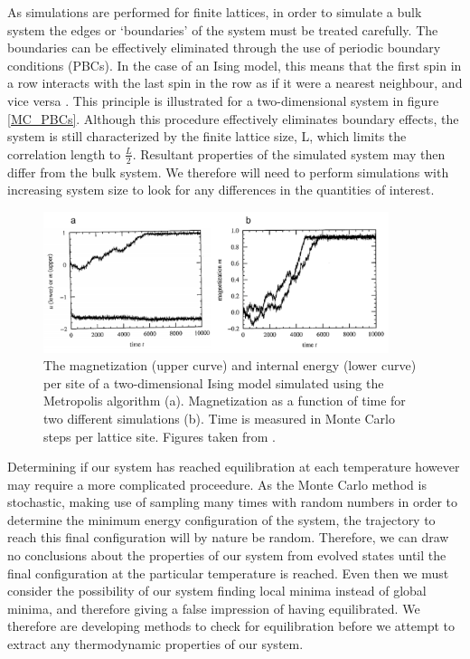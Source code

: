As simulations are performed for finite lattices, in order to simulate a bulk system the edges or `boundaries' of the system must be treated carefully. The boundaries can be effectively eliminated through the use of periodic boundary conditions (PBCs). In the case of an Ising model, this means that the first spin in a row interacts with the last spin in the row as if it were a nearest neighbour, and vice versa \cite{MC_Landau}. This principle is illustrated for a two-dimensional system in figure \ref{MC_PBCs}. Although this procedure effectively eliminates boundary effects, the system is still characterized by the finite lattice size, L, which limits the correlation length to $\frac{L}{2}$. Resultant properties of the simulated system may then differ from the bulk system. We therefore will need to perform simulations with increasing system size to look for any differences in the quantities of interest.

\begin{figure}[h!]
  \centering
    \includegraphics[width=0.9\textwidth]{figures/ising_equil.png}
    \caption{The magnetization (upper curve) and internal energy (lower curve) per site of a two-dimensional Ising model simulated using the Metropolis algorithm (a). Magnetization as a function of time for two different simulations (b). Time is measured in Monte Carlo steps per lattice site. Figures taken from .}
  \label{ising_equil}
\end{figure}

Determining if our system has reached equilibration at each temperature however may require a more complicated proceedure. As the Monte Carlo method is stochastic, making use of sampling many times with random numbers in order to determine the minimum energy configuration of the system, the trajectory to reach this final configuration will by nature be random. Therefore, we can draw no conclusions about the properties of our system from evolved states until the final configuration at the particular temperature is reached. Even then we must consider the possibility of our system finding local minima instead of global minima, and therefore giving a false impression of having equilibrated. We therefore are developing methods to check for equilibration before we attempt to extract any thermodynamic properties of our system.

